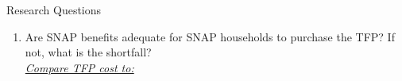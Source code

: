 \documentclass{beamer}
\begin{document}
\begin{frame}
\begin{figure}
\end{figure}
\end{frame}



\begin{frame}{Research Questions}
\begin{enumerate}
\item \large{Are SNAP benefits adequate for SNAP households to purchase the TFP? If not, what is the shortfall?}\\
\vskip6pt \hspace{2mm} \normalsize{\underline{\textit{Compare TFP cost to:}}}
\end{enumerate}
\end{frame}
\end{document}
